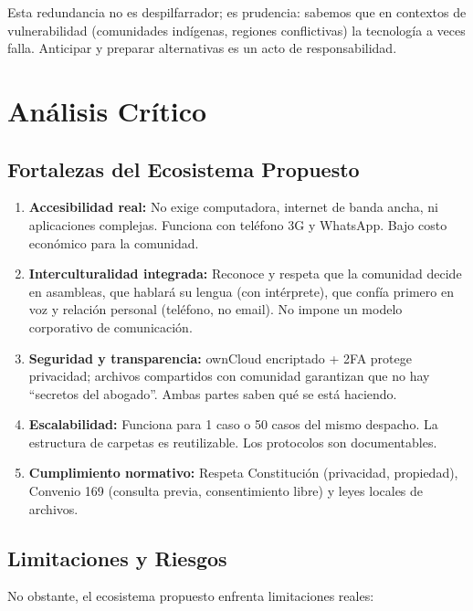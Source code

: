 ﻿\documentclass[
  spanish,
  letterpaper, oneside
]{article}
\begin{document}
Esta redundancia no es despilfarrador; es prudencia: sabemos que en contextos de vulnerabilidad 
(comunidades indígenas, regiones conflictivas) la tecnología a veces falla. Anticipar y preparar 
alternativas es un acto de responsabilidad.

\section{Análisis Crítico}

\subsection{Fortalezas del Ecosistema Propuesto}

\begin{enumerate}
  \item \textbf{Accesibilidad real:} No exige computadora, internet de banda ancha, ni 
  aplicaciones complejas. Funciona con teléfono 3G y WhatsApp. Bajo costo económico para la comunidad.
  
  \item \textbf{Interculturalidad integrada:} Reconoce y respeta que la comunidad decide 
  en asambleas, que hablará su lengua (con intérprete), que confía primero en voz y relación 
  personal (teléfono, no email). No impone un modelo corporativo de comunicación.
  
  \item \textbf{Seguridad y transparencia:} ownCloud encriptado + 2FA protege privacidad; 
  archivos compartidos con comunidad garantizan que no hay ``secretos del abogado''. 
  Ambas partes saben qué se está haciendo.
  
  \item \textbf{Escalabilidad:} Funciona para 1 caso o 50 casos del mismo despacho. 
  La estructura de carpetas es reutilizable. Los protocolos son documentables.
  
  \item \textbf{Cumplimiento normativo:} Respeta Constitución (privacidad, propiedad), 
  Convenio 169 (consulta previa, consentimiento libre) y leyes locales de archivos.
\end{enumerate}

\subsection{Limitaciones y Riesgos}

No obstante, el ecosistema propuesto enfrenta limitaciones reales:
\end{document}
